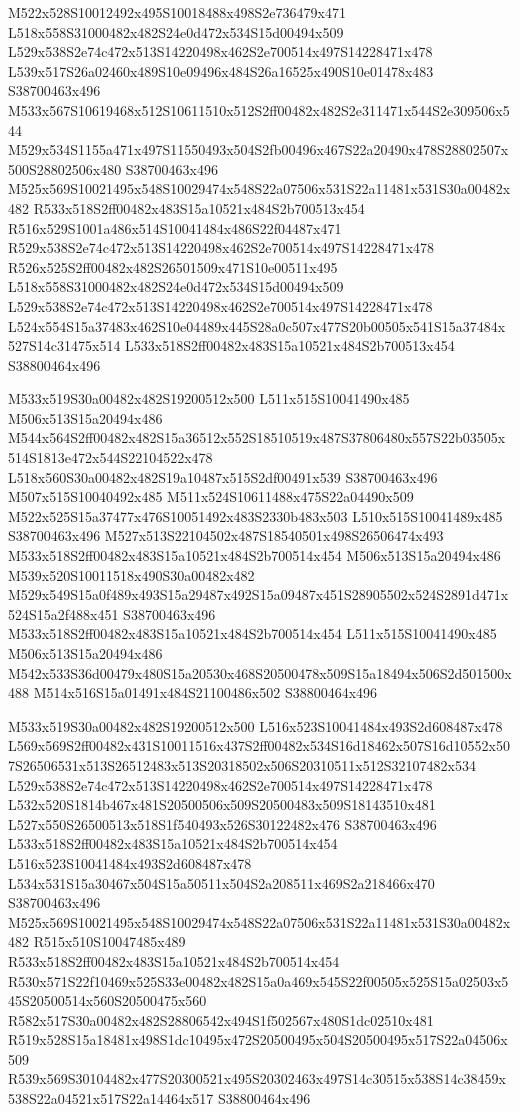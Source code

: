 \documentclass{article}
\begin{document}
\begin{multicols}{2}
M522x528S10012492x495S10018488x498S2e736479x471 L518x558S31000482x482S24e0d472x534S15d00494x509 L529x538S2e74c472x513S14220498x462S2e700514x497S14228471x478 L539x517S26a02460x489S10e09496x484S26a16525x490S10e01478x483 S38700463x496 M533x567S10619468x512S10611510x512S2ff00482x482S2e311471x544S2e309506x544 M529x534S1155a471x497S11550493x504S2fb00496x467S22a20490x478S28802507x500S28802506x480 S38700463x496 M525x569S10021495x548S10029474x548S22a07506x531S22a11481x531S30a00482x482 R533x518S2ff00482x483S15a10521x484S2b700513x454 R516x529S1001a486x514S10041484x486S22f04487x471 R529x538S2e74c472x513S14220498x462S2e700514x497S14228471x478 R526x525S2ff00482x482S26501509x471S10e00511x495 L518x558S31000482x482S24e0d472x534S15d00494x509 L529x538S2e74c472x513S14220498x462S2e700514x497S14228471x478 L524x554S15a37483x462S10e04489x445S28a0c507x477S20b00505x541S15a37484x527S14c31475x514 L533x518S2ff00482x483S15a10521x484S2b700513x454 S38800464x496

M533x519S30a00482x482S19200512x500 L511x515S10041490x485 M506x513S15a20494x486 M544x564S2ff00482x482S15a36512x552S18510519x487S37806480x557S22b03505x514S1813e472x544S22104522x478 L518x560S30a00482x482S19a10487x515S2df00491x539 S38700463x496 M507x515S10040492x485 M511x524S10611488x475S22a04490x509 M522x525S15a37477x476S10051492x483S2330b483x503 L510x515S10041489x485 S38700463x496 M527x513S22104502x487S18540501x498S26506474x493 M533x518S2ff00482x483S15a10521x484S2b700514x454 M506x513S15a20494x486 M539x520S10011518x490S30a00482x482 M529x549S15a0f489x493S15a29487x492S15a09487x451S28905502x524S2891d471x524S15a2f488x451 S38700463x496 M533x518S2ff00482x483S15a10521x484S2b700514x454 L511x515S10041490x485 M506x513S15a20494x486 M542x533S36d00479x480S15a20530x468S20500478x509S15a18494x506S2d501500x488 M514x516S15a01491x484S21100486x502 S38800464x496

M533x519S30a00482x482S19200512x500 L516x523S10041484x493S2d608487x478 L569x569S2ff00482x431S10011516x437S2ff00482x534S16d18462x507S16d10552x507S26506531x513S26512483x513S20318502x506S20310511x512S32107482x534 L529x538S2e74c472x513S14220498x462S2e700514x497S14228471x478 L532x520S1814b467x481S20500506x509S20500483x509S18143510x481 L527x550S26500513x518S1f540493x526S30122482x476 S38700463x496 L533x518S2ff00482x483S15a10521x484S2b700514x454 L516x523S10041484x493S2d608487x478 L534x531S15a30467x504S15a50511x504S2a208511x469S2a218466x470 S38700463x496 M525x569S10021495x548S10029474x548S22a07506x531S22a11481x531S30a00482x482 R515x510S10047485x489 R533x518S2ff00482x483S15a10521x484S2b700514x454 R530x571S22f10469x525S33e00482x482S15a0a469x545S22f00505x525S15a02503x545S20500514x560S20500475x560 R582x517S30a00482x482S28806542x494S1f502567x480S1dc02510x481 R519x528S15a18481x498S1dc10495x472S20500495x504S20500495x517S22a04506x509 R539x569S30104482x477S20300521x495S20302463x497S14c30515x538S14c38459x538S22a04521x517S22a14464x517 S38800464x496


\end{multicols}
\end{document}
